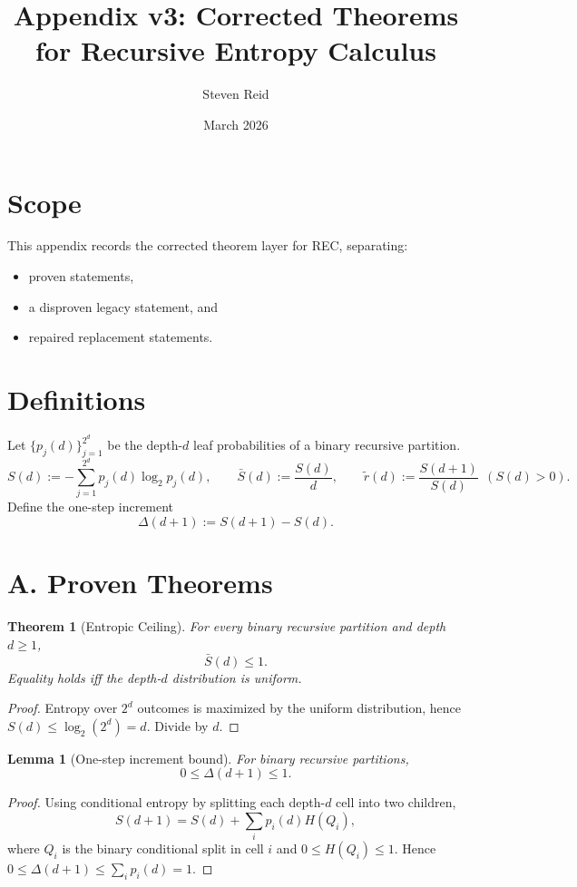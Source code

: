 \documentclass[11pt]{article}
\title{Appendix v3: Corrected Theorems for Recursive Entropy Calculus}
\author{Steven Reid}
\date{March 2026}
\newtheorem{theorem}{Theorem}
\newtheorem{lemma}{Lemma}
\theoremstyle{remark}
\begin{document}
\maketitle

\section*{Scope}
This appendix records the corrected theorem layer for REC, separating:
\begin{itemize}
  \item proven statements,
  \item a disproven legacy statement, and
  \item repaired replacement statements.
\end{itemize}

\section*{Definitions}
Let $\{p_j(d)\}_{j=1}^{2^d}$ be the depth-$d$ leaf probabilities of a binary recursive partition.
\[
S(d):=-\sum_{j=1}^{2^d}p_j(d)\log_2 p_j(d),\qquad
\bar S(d):=\frac{S(d)}{d},\qquad
\tilde r(d):=\frac{S(d+1)}{S(d)}\ \ (S(d)>0).
\]
Define the one-step increment
\[
\Delta(d+1):=S(d+1)-S(d).
\]

\section*{A. Proven Theorems}

\begin{theorem}[Entropic Ceiling]
For every binary recursive partition and depth $d\ge1$,
\[
\bar S(d)\le1.
\]
Equality holds iff the depth-$d$ distribution is uniform.
\end{theorem}

\begin{proof}
Entropy over $2^d$ outcomes is maximized by the uniform distribution, hence
$S(d)\le\log_2(2^d)=d$. Divide by $d$.
\end{proof}

\begin{lemma}[One-step increment bound]
For binary recursive partitions,
\[
0\le\Delta(d+1)\le1.
\]
\end{lemma}

\begin{proof}
Using conditional entropy by splitting each depth-$d$ cell into two children,
\[
S(d+1)=S(d)+\sum_i p_i(d)H(Q_i),
\]
where $Q_i$ is the binary conditional split in cell $i$ and $0\le H(Q_i)\le1$.
Hence $0\le\Delta(d+1)\le\sum_i p_i(d)=1$.
\end{proof}
\end{document}
